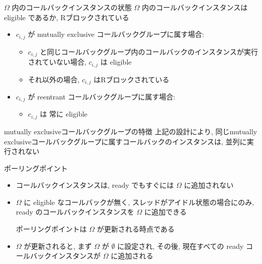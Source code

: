 \begin{frame}{$\Omega$ 内のコールバックインスタンスの状態}
    $\Omega$ 内のコールバックインスタンスは eligible であるか, Rブロックされている
    \begin{itemize}
        \item $c_{i, j}$ が mutually exclusive コールバックグループに属す場合:
              \begin{itemize}
                  \item $c_{i, j}$ と同じコールバックグループ内のコールバックのインスタンスが実行されていない場合, $c_{i, j}$ は eligible
                  \item それ以外の場合, $c_{i, j}$ はRブロックされている
              \end{itemize}
        \item $c_{i, j}$ が reentrant コールバックグループに属す場合:
              \begin{itemize}
                  \item $c_{i, j}$ は 常に eligible
              \end{itemize}
    \end{itemize}
\end{frame}

\begin{frame}{mutually exclusiveコールバックグループの特徴}
    上記の設計により, 同じmutually exclusiveコールバックグループに属すコールバックのインスタンスは, 並列に実行されない
\end{frame}


\begin{frame}{ポーリングポイント}
    \begin{itemize}
        \item コールバックインスタンスは, ready でもすぐには $\Omega$ に追加されない
        \item $\Omega$ に eligible なコールバックが無く, スレッドがアイドル状態の場合にのみ, ready のコールバックインスタンスを $\Omega$ に追加できる
              \begin{definition}[ポーリングポイント]
                  ポーリングポイントは $\Omega$ が更新される時点である
              \end{definition}
              \vspace{3mm}
        \item $\Omega$ が更新されると, まず $\Omega$ が $\emptyset$ に設定され, その後, 現在すべての ready コールバックインスタンスが $\Omega$ に追加される
    \end{itemize}
\end{frame}

